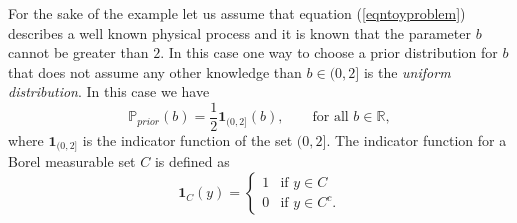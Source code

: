 \documentclass[12pt]{book}
\newcommand{\prior}{\mathbb{P}_{prior}}
\begin{document}
For the sake of
the example let us assume that 
equation (\ref{eqntoyproblem}) describes a well known physical process and it is known that
the parameter $b$ cannot be greater than $2$. In this case one way to choose a prior distribution
for $b$ that does not assume any other knowledge than $b\in (0,2]$ is the \textit{uniform distribution}. 
In this case we have 
\begin{equation}\label{eqnpriortoyproblem}
\prior(b)=\frac{1}{2}\textbf{1}_{(0,2]}(b),\qquad\text{for all $b\in\mathbb{R}$},
\end{equation}
where $\textbf{1}_{(0,2]}$ is the indicator function of the set $(0,2]$. The indicator function for a Borel measurable set $C$ is
defined as
\begin{equation*}
\textbf{1}_{C}(y)=\left\{
	\begin{array}{ll}
		1 & \mbox{if }	y\in C\\
		0 & \mbox{if }   y\in C^{c}.
	\end{array}
\right.
\end{equation*}
\end{document}
